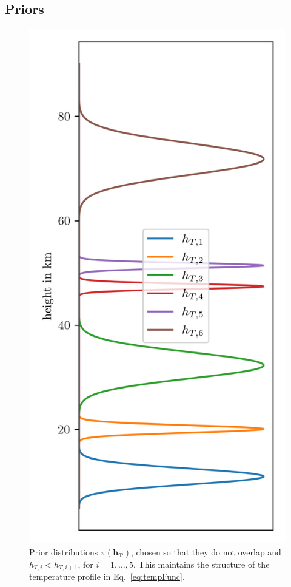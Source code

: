 \subsection{Priors}
\begin{figure}[ht!]
	\centering
	\includegraphics{HeightPriors.png}
	\caption[Prior distributions $\pi(\bm{h_T})$.]{Prior distributions $\pi(\bm{h_T})$, chosen so that they do not overlap and $h_{T,i} < h_{T,i+1}$, for $i = 1, \dots,5$.
	This maintains the structure of the temperature profile in Eq.~\ref{eq:tempFunc}.}
	\label{fig:HeightPriors}
\end{figure} 

